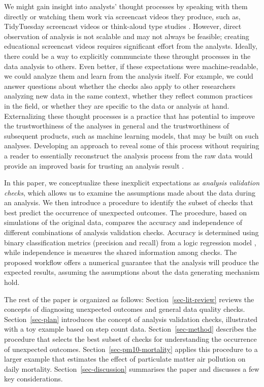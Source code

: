 \documentclass[
  12pt,
]{interact}
\begin{document}
We might gain insight into analysts' thought processes by speaking with
them directly or watching them work via screencast videos they produce,
such as, TidyTuesday screencast videos or think-aloud type studies
\citep[e.g.][]{gu2024data}. However, direct observation of analysis is
not scalable and may not always be feasible; creating educational
screencast videos requires significant effort from the analysts.
Ideally, there could be a way to explicitly communciate these throught
processes in the data analysis to others. Even better, if these
expectations were machine-readable, we could analyze them and learn from
the analysis itself. For example, we could answer questions about
whether the checks also apply to other researchers analyzing new data in
the same context, whether they reflect common practices in the field, or
whether they are specific to the data or analysis at hand. Externalizing
these thought processes is a practice that has potential to improve the
trustworthiness of the analyses \citep{yu2024veridical} in general and
the trustworthiness of subsequent products, such as machine learning
models, that may be built on such analyses. Developing an approach to
reveal some of this process without requiring a reader to essentially
reconstruct the analysis process from the raw data would provide an
improved basis for trusting an analysis result
\citep{peng2021reproducible}.

In this paper, we conceptualize these inexplicit expectations as
\emph{analysis validation checks}, which allows us to examine the
assumptions made about the data during an analysis. We then introduce a
procedure to identify the subset of checks that best predict the
occurrence of unexpected outcomes. The procedure, based on simulations
of the original data, compares the accuracy and independence of
different combinations of analysis validation checks. Accuracy is
determined using binary classification metrics (precision and recall)
from a logic regression model \citep{ruczinski_logic_2003}, while
independence is measures the shared information among checks. The
proposed workflow offers a numerical guarantee that the analysis will
produce the expected results, assuming the assumptions about the data
generating mechanism hold.

The rest of the paper is organized as follows:
Section~\ref{sec-lit-review} reviews the concepts of diagnosing
unexpected outcomes and general data quality checks.
Section~\ref{sec-plan} introduces the concept of analysis validation
checks, illustrated with a toy example based on step count data.
Section~\ref{sec-method} describes the procedure that selects the best
subset of checks for understanding the occurrence of unexpected
outcomes. Section~\ref{sec-pm10-mortality} applies this procedure to a
larger example that estimates the effect of particulate matter air
pollution on daily mortality. Section~\ref{sec-discussion} summarises
the paper and discusses a few key considerations.
\end{document}

